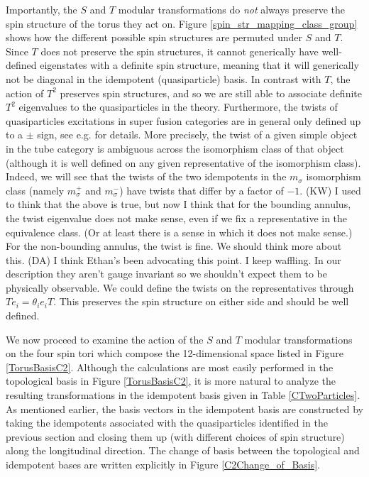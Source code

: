 \documentclass[12pt,a4paper]{article}
\newcommand{\kw}[1]{{\color{kwcolor}\footnotesize{(KW) #1}}}
\newcommand{\dave}[1]{{\color{ao(english)}\footnotesize{(DA) #1}}}
\begin{document}
Importantly, the $S$ and $T$ modular transformations do {\it not} always preserve the spin structure of the torus they act on. 
Figure \ref{spin_str_mapping_class_group} shows how the different possible spin structures are permuted under $S$ and $T$. 
Since $T$ does not preserve the spin structures, it cannot generically have well-defined eigenstates with a definite spin structure,
meaning that it will generically not be diagonal in the idempotent (quasiparticle) basis. 
In contrast with $T$, the action of $T^2$ preserves spin structures, and so we are still able to associate 
definite $T^2$ 
eigenvalues to the quasiparticles in the theory.
Furthermore, the twists of quasiparticles excitations in super fusion categories are in general only defined 
up to a $\pm$ sign, see e.g. \cite{cano2014,bruillard2017,gu2014} for details.
More precisely, the twist of a given simple object in the tube category is ambiguous across the isomorphism 
class of that object (although it is well defined on any given representative of the isomorphism class). 
Indeed, we will see that the twists of the two idempotents in the $m_\sigma$ isomorphism class (namely $m_\sigma^+$ and 
$m_\sigma^-$) have twists that differ by a factor of $-1$. 
\kw{I used to think that the above is true, but now I think that for the bounding annulus, the twist eigenvalue
does not make sense, even if we fix a representative in the equivalence class.
(Or at least there is a sense in which it does not make sense.)
For the non-bounding annulus, the twist is fine.
We should think more about this.}
\dave{
I think Ethan's been advocating this point.
I keep waffling. 
In our description they aren't gauge invariant so we shouldn't expect them to be physically observable.
We could define the twists on the representatives through $T e_i = \theta_i e_iT$.
This preserves the spin structure on either side and should be well defined.
}


We now proceed to examine the action of the $S$ and $T$ modular transformations on the four spin tori which compose 
the 12-dimensional space listed in Figure \ref{TorusBasisC2}.
Although the calculations are most easily performed in the topological basis in Figure \ref{TorusBasisC2}, 
it is more natural to analyze the resulting transformations in the idempotent basis given in Table \ref{CTwoParticles}. 
As mentioned earlier, the basis vectors in the idempotent basis are constructed by taking the idempotents associated with the 
quasiparticles identified in the previous section and closing them up (with different choices of spin structure) 
along the longitudinal direction. 
The change of basis between the topological and idempotent bases are written explicitly in Figure \ref{C2Change_of_Basis}. 
\end{document}
